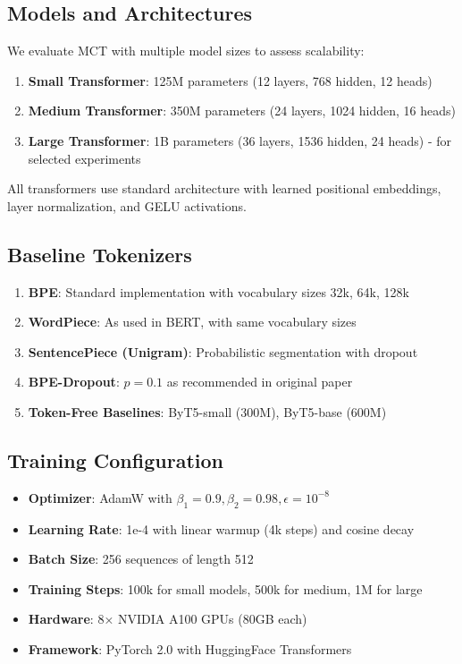 \documentclass[conference]{IEEEtran}
\begin{document}
\subsection{Models and Architectures}
We evaluate MCT with multiple model sizes to assess scalability:
\begin{enumerate}
    \item \textbf{Small Transformer}: 125M parameters (12 layers, 768 hidden, 12 heads)
    \item \textbf{Medium Transformer}: 350M parameters (24 layers, 1024 hidden, 16 heads)
    \item \textbf{Large Transformer}: 1B parameters (36 layers, 1536 hidden, 24 heads) - for selected experiments
\end{enumerate}

All transformers use standard architecture with learned positional embeddings, layer normalization, and GELU activations.

\subsection{Baseline Tokenizers}
\begin{enumerate}
    \item \textbf{BPE}: Standard implementation with vocabulary sizes 32k, 64k, 128k
    \item \textbf{WordPiece}: As used in BERT, with same vocabulary sizes
    \item \textbf{SentencePiece (Unigram)}: Probabilistic segmentation with dropout
    \item \textbf{BPE-Dropout}: $p = 0.1$ as recommended in original paper
    \item \textbf{Token-Free Baselines}: ByT5-small (300M), ByT5-base (600M)
\end{enumerate}

\subsection{Training Configuration}
\begin{itemize}
    \item \textbf{Optimizer}: AdamW with $\beta_1 = 0.9, \beta_2 = 0.98, \epsilon = 10^{-8}$
    \item \textbf{Learning Rate}: 1e-4 with linear warmup (4k steps) and cosine decay
    \item \textbf{Batch Size}: 256 sequences of length 512
    \item \textbf{Training Steps}: 100k for small models, 500k for medium, 1M for large
    \item \textbf{Hardware}: 8× NVIDIA A100 GPUs (80GB each)
    \item \textbf{Framework}: PyTorch 2.0 with HuggingFace Transformers
\end{itemize}
\end{document}
